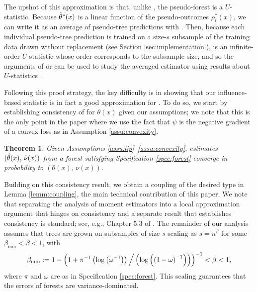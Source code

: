\documentclass[aos]{imsart}
\theoremstyle{plain}
\newtheorem{theo}[prop]{Theorem}
\theoremstyle{definition}
\theoremstyle{remark}
\begin{document}
\begin{CJK}{UTF8}{gbsn}
The upshot of this approximation is that, unlike , the pseudo-forest
 is a $U$-statistic.
Because $\tilde{\theta}^*(x)$ is a linear function of the pseudo-outcomes $\rho_i^*(x)$,
we can write it as an average of pseudo-tree predictions
 with
.
Then, because each individual pseudo-tree prediction  is trained on a size-$s$ subsample
of the training data drawn without replacement (see Section \ref{sec:implementation}), 
 is an infinite-order $U$-statistic whose order corresponds to the subsample size,
and so the arguments of \citet{mentch2016quantifying} or \citet{wager2015estimation} can be used to study the averaged estimator
 using results about $U$-statistics \citep{hoeffding1948class,efron1981jackknife}.

Following this proof strategy, the key difficulty is in showing that our influence-based statistic
 is in fact a good approximation for .
To do so, we start by establishing consistency of  for $\theta(x)$ given
our assumptions; we note that this is the only point in the paper where we use the fact that
$\psi$ is the negative gradient of a convex loss as in Assumption \ref{assu:convexity}.

\begin{theo}
\label{theo:consistency}
Given Assumptions \ref{assu:lip}--\ref{assu:convexity},
estimates $(\hat{\theta}(x), \, \hat{\nu}(x))$ from a 
forest satisfying Specification \ref{spec:forest}
converge in probability to $(\theta(x), \, \nu(x))$.
\end{theo}

Building on this consistency result, we obtain a coupling of the desired type in Lemma \ref{lemm:coupling},
the main technical contribution of this paper.
We note that separating the analysis of moment estimators
into a local approximation argument that hinges on consistency and a separate result that establishes
consistency is standard; see, e.g., Chapter 5.3 of \citet{van2000asymptotic}.
The remainder of our analysis assumes that trees are grown on subsamples of size $s$
scaling as $s = n^\beta$ for some $\beta_{\min} < \beta < 1$, with
\begin{equation}
\label{eq:scaling}
\beta_{\min} := 1 - \p{1 + \pi^{-1} \p{\log\p{\omega^{-1}}} \Big/\p{\log\p{\p{1 - \omega}^{-1}}}}^{-1} < \beta < 1,
\end{equation}
where $\pi$ and $\omega$ are as in Specification \ref{spec:forest}.
This scaling guarantees that the errors of forests are variance-dominated.


\end{CJK}
\end{document}
